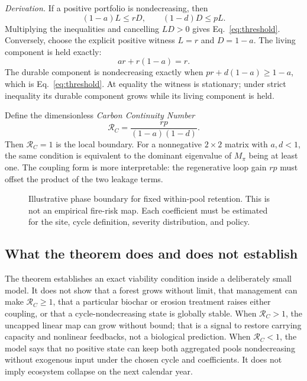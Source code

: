 \documentclass[10pt]{article}
\newcommand{\RC}{\mathcal{R}_{\!C}}
\begin{document}
\emph{Derivation.}  If a positive portfolio is nondecreasing, then
\begin{equation}
(1-a)L\le rD,\qquad (1-d)D\le pL.
\end{equation}
Multiplying the inequalities and cancelling $LD>0$ gives
Eq.~\eqref{eq:threshold}.  Conversely, choose the explicit positive witness
$L=r$ and $D=1-a$.  The living component is held exactly:
\begin{equation}
a r+r(1-a)=r.
\end{equation}
The durable component is nondecreasing exactly when
$pr+d(1-a)\ge1-a$, which is Eq.~\eqref{eq:threshold}.  At equality the witness
is stationary; under strict inequality its durable component grows while its
living component is held.

Define the dimensionless \emph{Carbon Continuity Number}
\begin{equation}
\RC=\frac{rp}{(1-a)(1-d)}.
\label{eq:rc}
\end{equation}
Then $\RC=1$ is the local boundary.  For a nonnegative $2\times2$ matrix with
$a,d<1$, the same condition is equivalent to the dominant eigenvalue of
$M_{\pi}$ being at least one.  The coupling form is more interpretable: the
regenerative loop gain $rp$ must offset the product of the two leakage terms.

\begin{figure}[t]
\centering
\resizebox{0.72\linewidth}{!}{}
\caption{Illustrative phase boundary for fixed within-pool retention.  This is
not an empirical fire-risk map.  Each coefficient must be estimated for the
site, cycle definition, severity distribution, and policy.}
\label{fig:phase}
\end{figure}

\subsection{What the theorem does and does not establish}

The theorem establishes an exact viability condition inside a deliberately
small model.  It does not show that a forest grows without limit, that
management can make $\RC\ge1$, that a particular biochar or erosion treatment
raises either coupling, or that a cycle-nondecreasing state is globally stable.
When $\RC>1$, the uncapped linear map can grow without bound; that is a signal
to restore carrying capacity and nonlinear feedbacks, not a biological
prediction.  When $\RC<1$, the model says that no positive state can keep both
aggregated pools nondecreasing without exogenous input under the chosen cycle
and coefficients.  It does not imply ecosystem collapse on the next calendar
year.
\end{document}
